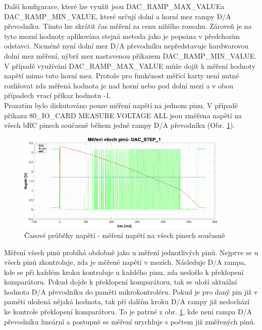Další konfigurace, které lze využít jsou DAC\_RAMP\_MAX\_VALUE\linebreak a DAC\_RAMP\_MIN\_VALUE,
které určují dolní a horní mez rampy D/A převodníku. Tímto lze zkrátit čas měření za cenu nižšího rozsahu.
Zároveň je na tyto mezní hodnoty aplikována stejná metoda jako je popsána v předchozím odstavci. Nicméně nyní dolní mez D/A převodníku nepředstavuje hardwarovou dolní mez měření,
nýbrž mez nastavenou příkazem DAC\_RAMP\_MIN\_VALUE. V případě využívání DAC\_RAMP\_MAX\_VALUE může dojít k měření hodnoty napětí mimo tuto horní mez. Protože pro funkčnost měřící karty není
nutné rozlišovat zda měřená hodnota je nad horní nebo pod dolní mezí a v obou případech vrací příkaz hodnotu -1.\\ 

Prozatím  bylo diskutováno pouze měření napětí na jednom pinu.
V případě \linebreak příkazu 80\_IO\_CARD MEASURE VOLTAGE ALL jsou změřena napětí na všech bRC pinech současně během jedné rampy
D/A převodníku (Obr. \ref{fig: bRC pin voltage measurement allpins}).

\begin{figure}[ht!]
    \centering
    \includegraphics[width = 0.9\textwidth]{obrazky/matlab_generated/all_pins.eps}
    \caption{Časové průběhy napětí - měření napětí na všech pinech současně}
    \label{fig: bRC pin voltage measurement allpins}
\end{figure}

Měření všech pinů probíhá obdobně jako u měření jednotlivých pinů. Nejprve se u všech pinů zkontroluje, zda je měřené napětí v mezích.
Následuje D/A rampa, kde se při každém kroku kontroluje u každého pinu, zda nedošlo k překlopení komparátoru. Pokud dojde k překlopení komparátoru,
tak se uloží aktuální hodnota D/A převodníku do paměti mikrokontroléru. Pokud je pro daný pin již v paměti uložená nějaká hodnota, tak při dalším
kroku D/A rampy již nedochází ke kontrole překlopení komparátoru. To je patrné z obr. \ref{fig: bRC pin voltage measurement allpins}, kde není rampa
D/A převodníku lineární a postupně se měření urychluje s počtem již změřených pinů.\\ 

